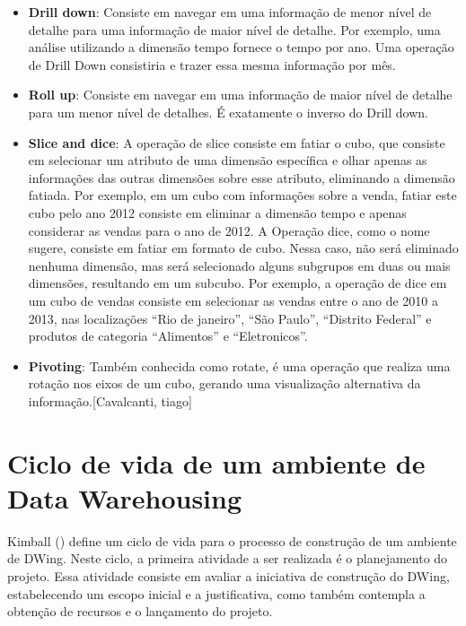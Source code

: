 \begin{itemize}
\item \textbf{Drill down}: Consiste em navegar em uma informação de menor nível de detalhe para uma informação de maior nível de detalhe. Por exemplo, uma análise utilizando a dimensão tempo fornece o tempo por ano. Uma operação de Drill Down consistiria e trazer essa mesma informação por mês.
\item \textbf{Roll up}: Consiste em navegar em uma informação de maior nível de detalhe para um menor nível de detalhes. É exatamente o inverso do Drill down.
\item \textbf{Slice and dice}: A operação de slice consiste em fatiar o cubo, que consiste em selecionar um atributo de uma dimensão específica e olhar apenas as informações das outras dimensões sobre esse atributo, eliminando a dimensão fatiada. Por exemplo, em um cubo com informações sobre a venda,  fatiar este cubo pelo ano 2012 consiste em eliminar a dimensão tempo e apenas considerar as vendas para o ano de 2012. A Operação dice, como o nome sugere, consiste em fatiar em formato de cubo. Nessa caso, não será eliminado nenhuma dimensão, mas será selecionado alguns subgrupos em duas ou mais dimensões, resultando em um subcubo. Por exemplo,  a operação de dice em um cubo de vendas consiste em selecionar as vendas entre o ano de 2010 a 2013, nas localizações “Rio de janeiro”, “São Paulo”, “Distrito Federal” e produtos de categoria “Alimentos” e “Eletronicos”.
\item \textbf{Pivoting}: Também conhecida como rotate, é uma operação que realiza uma rotação nos eixos de um cubo, gerando uma visualização alternativa da informação.[Cavalcanti, tiago]
\end{itemize}

%

\section{Ciclo de vida de um ambiente de Data Warehousing}

%

Kimball (\citeyear{kimball2002}) define um ciclo de vida para o processo de construção de um ambiente de DWing. Neste ciclo, a primeira atividade a ser realizada é o planejamento do projeto. Essa atividade consiste em avaliar a iniciativa de construção do DWing, estabelecendo um escopo inicial e a justificativa, como também contempla a obtenção  de recursos e o lançamento do projeto.

